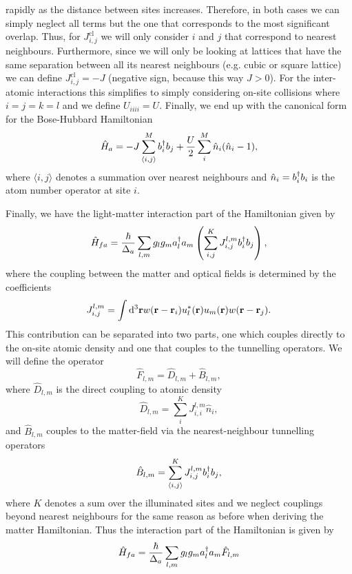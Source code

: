 rapidly as the distance between sites increases. Therefore, in both
cases we can simply neglect all terms but the one that corresponds to
the most significant overlap. Thus, for $J_{i,j}^\mathrm{cl}$ we will
only consider $i$ and $j$ that correspond to nearest neighbours.
Furthermore, since we will only be looking at lattices that have the
same separation between all its nearest neighbours (e.g. cubic or
square lattice) we can define $J_{i,j}^\mathrm{cl} = - J$ (negative
sign, because this way $J > 0$). For the inter-atomic interactions
this simplifies to simply considering on-site collisions where
$i=j=k=l$ and we define $U_{iiii} = U$. Finally, we end up with the
canonical form for the Bose-Hubbard Hamiltonian
\begin{equation}
  \hat{H}_a = -J \sum_{\langle i,j \rangle}^M b^\dagger_i b_j + 
  \frac{U}{2} \sum_{i}^M \hat{n}_i (\hat{n}_i - 1),
\end{equation}
where $\langle i,j \rangle$ denotes a summation over nearest
neighbours and $\hat{n}_i = b^\dagger_i b_i$ is the atom number operator at
site $i$.

Finally, we have the light-matter interaction part of the Hamiltonian
given by
\begin{equation}
  \hat{H}_{fa} = \frac{\hbar}{\Delta_a} \sum_{l,m} g_l g_m a^\dagger_l a_m
  \left( \sum_{i,j}^K J^{l,m}_{i,j} b^\dagger_i b_j \right),
\end{equation}
where the coupling between the matter and optical fields is determined
by the coefficients
\begin{equation}
  J^{l,m}_{i,j} = \int \mathrm{d}^3 \mathbf{r} w(\mathbf{r} - \mathbf{r}_i)
  u_l^*(\mathbf{r}) u_m(\mathbf{r}) w(\mathbf{r} - \mathbf{r}_j).
\end{equation}
This contribution can be separated into two parts, one which couples
directly to the on-site atomic density and one that couples to the
tunnelling operators. We will define the operator
\begin{equation}
  \label{eq:F}
  \hat{F}_{l,m} = \hat{D}_{l,m} + \hat{B}_{l,m},
\end{equation}
where $\hat{D}_{l,m}$ is the direct coupling to atomic density
\begin{equation}
  \label{eq:D}
  \hat{D}_{l,m} = \sum_{i}^K J^{l,m}_{i,i} \hat{n}_i,
\end{equation}
and $\hat{B}_{l,m}$ couples to the matter-field via the
nearest-neighbour tunnelling operators
\begin{equation}
  \label{eq:B}
  \hat{B}_{l,m} = \sum_{\langle i, j \rangle}^K J^{l,m}_{i,j} b^\dagger_i b_j,
\end{equation}
where $K$ denotes a sum over the illuminated sites and we neglect
couplings beyond nearest neighbours for the same reason as before when
deriving the matter Hamiltonian. Thus the interaction part of the
Hamiltonian is given by
\begin{equation}
  \hat{H}_{fa} = \frac{\hbar}{\Delta_a} \sum_{l,m} g_l g_m a^\dagger_l a_m \hat{F}_{l,m}
\end{equation}

